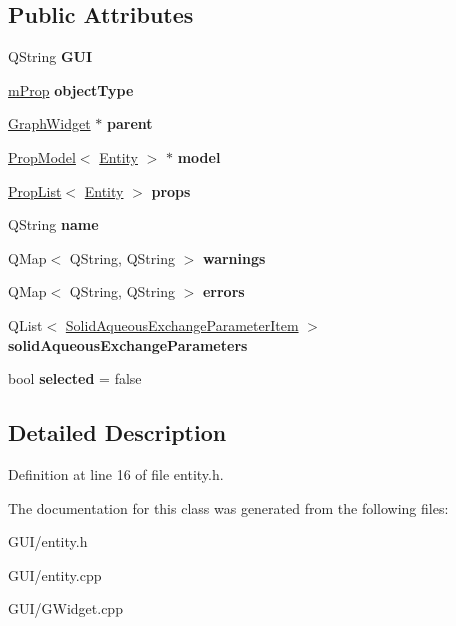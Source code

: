 \subsection*{Public Attributes}
\begin{DoxyCompactItemize}
\item 
\mbox{\label{class_entity_a97a861dbf350bbd571283bb3f316f50f}} 
Q\+String {\bfseries G\+UI}
\item 
\mbox{\label{class_entity_a97e03fc644d5b5ea45035df10ae47674}} 
\hyperlink{classm_prop}{m\+Prop} {\bfseries object\+Type}
\item 
\mbox{\label{class_entity_a5c73075846b554e592a3b3291e2a1762}} 
\hyperlink{class_graph_widget}{Graph\+Widget} $\ast$ {\bfseries parent}
\item 
\mbox{\label{class_entity_a091545a50df9666a8549c80dc5c7d64d}} 
\hyperlink{class_prop_model}{Prop\+Model}$<$ \hyperlink{class_entity}{Entity} $>$ $\ast$ {\bfseries model}
\item 
\mbox{\label{class_entity_afa1be08f2947c897e3b990760a0db89a}} 
\hyperlink{class_prop_list}{Prop\+List}$<$ \hyperlink{class_entity}{Entity} $>$ {\bfseries props}
\item 
\mbox{\label{class_entity_a623c98d92aebaddd3dcf7c9a56219d95}} 
Q\+String {\bfseries name}
\item 
\mbox{\label{class_entity_a5cb3f0d2a4dee33bb7d5eeace4573f49}} 
Q\+Map$<$ Q\+String, Q\+String $>$ {\bfseries warnings}
\item 
\mbox{\label{class_entity_aff4fd1029489706963372112babd15b6}} 
Q\+Map$<$ Q\+String, Q\+String $>$ {\bfseries errors}
\item 
\mbox{\label{class_entity_a240aeb53e801e1618187157de90a1043}} 
Q\+List$<$ \hyperlink{struct_solid_aqueous_exchange_parameter_item}{Solid\+Aqueous\+Exchange\+Parameter\+Item} $>$ {\bfseries solid\+Aqueous\+Exchange\+Parameters}
\item 
\mbox{\label{class_entity_a58858410e67b146b0d830568d5eefa01}} 
bool {\bfseries selected} = false
\end{DoxyCompactItemize}


\subsection{Detailed Description}


Definition at line 16 of file entity.\+h.



The documentation for this class was generated from the following files\+:\begin{DoxyCompactItemize}
\item 
G\+U\+I/entity.\+h\item 
G\+U\+I/entity.\+cpp\item 
G\+U\+I/G\+Widget.\+cpp\end{DoxyCompactItemize}

